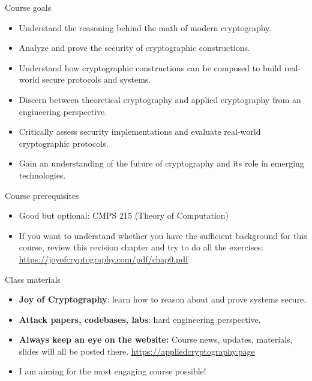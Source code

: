 \documentclass[aspectratio=169, lualatex, handout]{beamer}
\begin{document}
\begin{frame}{Course goals}
	\begin{itemize}[<+->]
		\item Understand the reasoning behind the math of modern cryptography.
		\item Analyze and prove the security of cryptographic constructions.
		\item Understand how cryptographic constructions can be composed to build real-world
		      secure protocols and systems.
		\item Discern between theoretical cryptography and applied cryptography from
		      an engineering perspective.
		\item Critically assess security implementations and evaluate real-world cryptographic
		      protocols.
		\item Gain an understanding of the future of cryptography and its role in emerging
		      technologies.
	\end{itemize}
\end{frame}

\begin{frame}{Course prerequisites}
	\begin{itemize}
		\item Good but optional: CMPS 215 (Theory of Computation)
		\item If you want to understand whether you have the sufficient background for this course, review this revision chapter and try to do all the exercises: \url{https://joyofcryptography.com/pdf/chap0.pdf}
	\end{itemize}
\end{frame}

\begin{frame}{Class materials}
	\begin{itemize}[<+->]
		\item \textbf{Joy of Cryptography}: learn how to reason about and prove systems secure.
		\item \textbf{Attack papers, codebases, labs}: hard engineering perspective.
		      \vspace{1cm}
		\item \textbf{Always keep an eye on the website:} Course news, updates,
		      materials, slides will all be posted there.
		      \url{https://appliedcryptography.page}
		\item I am aiming for the most engaging course possible!
	\end{itemize}
\end{frame}
\end{document}

